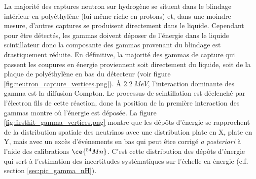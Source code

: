 La majorité des captures neutron sur hydrogène se situent dans le blindage intérieur en polyéthylène (lui-même riche en protons) et, dans une moindre mesure, d'autres captures se produisent directement dans le liquide. Cependant pour être détectés, les gammas doivent déposer de l'énergie dans le liquide scintillateur donc la composante des gammas provenant du blindage est drastiquement réduite. En définitive, la majorité des gammas de capture qui passent les coupures en énergie proviennent soit directement du liquide, soit de la plaque de polyéthylène en bas du détecteur (voir figure \ref{fig:neutron_capture_vertices.png}). À $\SI{2.2}{MeV}$, l'interaction dominante des gamma est la diffusion Compton. Le processus de scintillation est déclenché par l'électron fils de cette réaction, donc la position de la première interaction des gammas montre où l'énergie est déposée. La figure \ref{fig:firsthit_gamma_vertices.png} montre que les dépôts d'énergie se rapprochent de la distribution spatiale des neutrinos avec une distribution plate en X, plate en Y, mais avec un excès d'événements en bas qui peut être corrigé \textit{a posteriori} à l'aide des calibrations $\ce{^{54}Mn}$. C'est cette distribution des dépôts d'énergie qui sert à l'estimation des incertitudes systématiques sur l'échelle en énergie (c.f. section \ref{sec:pic_gamma_nH}).\\

\bigbreak

